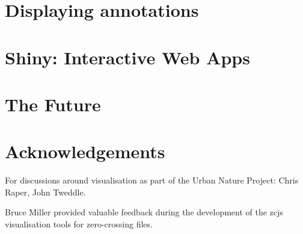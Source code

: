 \documentclass[
]{book}
\begin{document}
\hypertarget{displaying-annotations}{%
\chapter{Displaying annotations}\label{displaying-annotations}}

\hypertarget{shiny-interactive-web-apps}{%
\chapter{Shiny: Interactive Web Apps}\label{shiny-interactive-web-apps}}

\hypertarget{the-future}{%
\chapter{The Future}\label{the-future}}

\hypertarget{acknowledgements}{%
\chapter{Acknowledgements}\label{acknowledgements}}

For discussions around visualisation as part of the Urban Nature Project: Chris Raper, John Tweddle.

Bruce Miller provided valuable feedback during the development of the zcjs visualisation tools for zero-crossing files.

  
\end{document}
